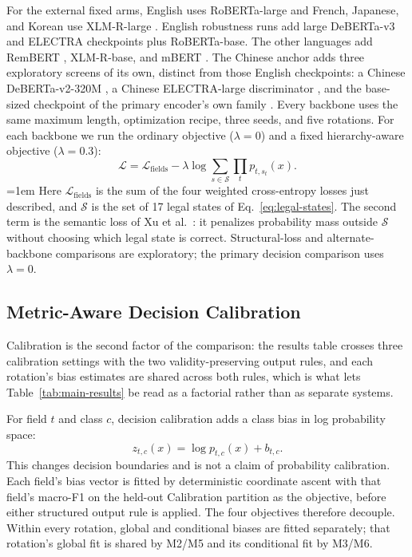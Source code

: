 For the external fixed arms, English uses RoBERTa-large
\cite{liu2019roberta} and French, Japanese, and Korean use XLM-R-large
\cite{conneau2020xlmr}. English robustness runs add large DeBERTa-v3
\cite{he2023debertav3} and ELECTRA \cite{clark2020electra} checkpoints plus
RoBERTa-base. The other languages add RemBERT \cite{chung2021rembert},
XLM-R-base, and mBERT \cite{devlin2019bert}. The Chinese anchor adds three
exploratory screens of its own, distinct from those English checkpoints: a
Chinese DeBERTa-v2-320M \cite{fengshenbang}, a Chinese ELECTRA-large
discriminator
\cite{cui2020revisiting}, and the base-sized checkpoint of the primary
encoder's own family \cite{cui2021wwm}. Every backbone uses the same maximum
length, optimization recipe, three seeds, and five rotations. For each
backbone we run the ordinary objective ($\lambda=0$) and a fixed
hierarchy-aware objective ($\lambda=0.3$):
\begin{equation}
  \mathcal L=\mathcal L_{\mathrm{fields}}-
  \lambda\log\sum_{s\in\mathcal S}\prod_t p_{t,s_t}(x).
  \label{eq:structural-loss}
\end{equation}
\begingroup\emergencystretch=1em
Here $\mathcal L_{\mathrm{fields}}$ is the sum of the four weighted
cross-entropy losses just described, and $\mathcal S$ is the set of 17 legal
states of Eq.~\eqref{eq:legal-states}. The second term is the semantic loss of
Xu et al.\ \cite{xu2018semantic}: it
penalizes probability mass outside $\mathcal S$ without choosing which
legal state is correct. Structural-loss and alternate-backbone
comparisons are exploratory; the primary decision comparison uses
$\lambda=0$.
\par\endgroup

\subsection{Metric-Aware Decision Calibration}
Calibration is the second factor of the comparison: the results table crosses
three calibration settings with the two validity-preserving output rules, and
each rotation's bias estimates are shared across both rules, which is what
lets Table~\ref{tab:main-results} be read as a factorial rather than as
separate systems.

For field $t$ and class $c$, decision calibration adds a class bias in log
probability space:
\begin{equation}
  z_{t,c}(x)=\log p_{t,c}(x)+b_{t,c}.
  \label{eq:decision-calibration}
\end{equation}
This changes decision boundaries and is not a claim of probability
calibration. Each field's bias vector is fitted by deterministic coordinate
ascent with that field's macro-F1 on the held-out Calibration partition as the
objective, before either structured output rule is applied. The four objectives
therefore decouple. Within every rotation, global and conditional biases are
fitted separately; that rotation's global fit is shared by M2/M5 and its
conditional fit by M3/M6.


